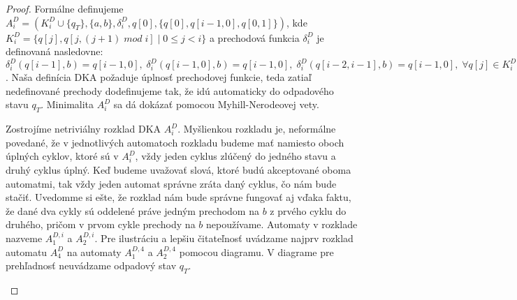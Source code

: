 \begin{proof}
Formálne definujeme $ A_i^D = (K_i^D \cup \lbrace q_T \rbrace,\lbrace a,b \rbrace, \delta_i^D, q[0], \lbrace q[0], q[i-1,0],q[0,1] \rbrace) $, kde $ K_i^D = \lbrace q[j],q[j,(j+1) \; mod \; i] \; | \; 0 \leq j < i \rbrace $ a prechodová funkcia $ \delta_i^D $ je definovaná nasledovne: $ \delta_i^D(q[i-1],b) = q[i-1,0], \; \delta_i^D(q[i-1,0],b) = q[i-1,0], \; \delta_i^D(q[i-2,i-1],b) = q[i-1,0] , \; \forall q[j] \in K_i^D : \delta_i^D(q[j],a) = q[(j+1) \; mod \; i], \; \forall q[j,k] \in K_i^D : \delta_i^D(q[j,k],a) = \lbrace q[(j+1) \; mod \; i, (k+1) \; mod \; i] \rbrace $. Naša definícia DKA požaduje úplnosť prechodovej funkcie, teda zatiaľ nedefinované prechody dodefinujeme tak, že idú automaticky do odpadového stavu $ q_T $. Minimalita $ A_i^D $ sa dá dokázať pomocou Myhill-Nerodeovej vety.
\par
Zostrojíme netriviálny rozklad DKA $ A_i^D $. Myšlienkou rozkladu je, neformálne povedané, že v jednotlivých automatoch rozkladu budeme mať namiesto oboch úplných cyklov, ktoré sú v $ A_i^D $, vždy jeden cyklus \glqq{}zlúčený\grqq{} do jedného stavu a druhý cyklus úplný. Keď budeme uvažovať slová, ktoré budú akceptované oboma automatmi, tak vždy jeden automat správne zráta daný cyklus, čo nám bude stačiť. Uvedomme si ešte, že rozklad nám bude správne fungovať aj vďaka faktu, že dané dva cykly sú oddelené práve jedným prechodom na $ b $ z prvého cyklu do druhého, pričom v prvom cykle prechody na $ b $ nepoužívame. Automaty v rozklade nazveme $ A_1^{D,i}$ a $ A_2^{D,i} $. Pre ilustráciu a lepšiu čitateľnosť uvádzame najprv rozklad automatu $ A_4^D $ na automaty $ A_1^{D,4} $ a $ A_2^{D,4} $ pomocou diagramu. V diagrame pre prehľadnosť neuvádzame odpadový stav $ q_T $.

\begin{figure}[H]
\label{fig:ndet_vs_det_diff_big_DFA_dec}
\centering
{}


\end{figure}
\end{proof}
